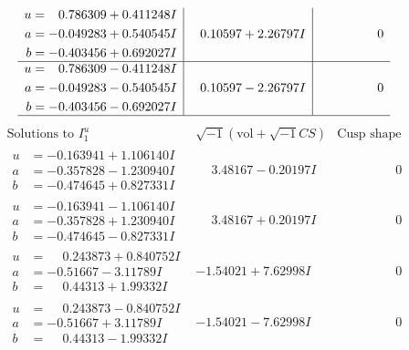 \documentclass[1p]{elsarticle_modified}
\theoremstyle{definition}
\newcommand{\I}{\sqrt{-1}}
\begin{document}
$$\begin{array}{c|c|c}
\begin{aligned}
u &= \phantom{-}0.786309 + 0.411248 I \\
a &= -0.049283 + 0.540545 I \\
b &= -0.403456 + 0.692027 I\end{aligned}
 & \phantom{-}0.10597 + 2.26797 I & \phantom{-0.000000 } 0 \\ \hline\begin{aligned}
u &= \phantom{-}0.786309 - 0.411248 I \\
a &= -0.049283 - 0.540545 I \\
b &= -0.403456 - 0.692027 I\end{aligned}
 & \phantom{-}0.10597 - 2.26797 I & \phantom{-0.000000 } 0\\
 \hline 
 \end{array}$$\newpage$$\begin{array}{c|c|c}  
\text{Solutions to }I^u_{1}& \I (\text{vol} + \sqrt{-1}CS) & \text{Cusp shape}\\
 \hline 
\begin{aligned}
u &= -0.163941 + 1.106140 I \\
a &= -0.357828 - 1.230940 I \\
b &= -0.474645 + 0.827331 I\end{aligned}
 & \phantom{-}3.48167 - 0.20197 I & \phantom{-0.000000 } 0 \\ \hline\begin{aligned}
u &= -0.163941 - 1.106140 I \\
a &= -0.357828 + 1.230940 I \\
b &= -0.474645 - 0.827331 I\end{aligned}
 & \phantom{-}3.48167 + 0.20197 I & \phantom{-0.000000 } 0 \\ \hline\begin{aligned}
u &= \phantom{-}0.243873 + 0.840752 I \\
a &= -0.51667 - 3.11789 I \\
b &= \phantom{-}0.44313 + 1.99332 I\end{aligned}
 & -1.54021 + 7.62998 I & \phantom{-0.000000 } 0 \\ \hline\begin{aligned}
u &= \phantom{-}0.243873 - 0.840752 I \\
a &= -0.51667 + 3.11789 I \\
b &= \phantom{-}0.44313 - 1.99332 I\end{aligned}
 & -1.54021 - 7.62998 I & \phantom{-0.000000 } 0 \\ \hline\begin{aligned}

\end{aligned}
\end{array}$$
\end{document}
